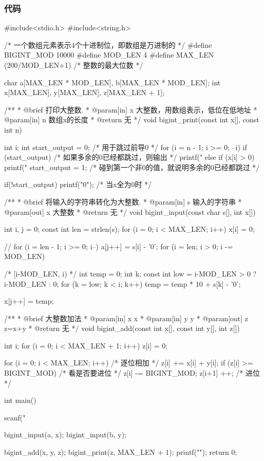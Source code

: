 \subsubsection{代码}
\begin{Codex}[label=bigint_add.c]
#include<stdio.h>
#include<string.h>

/* 一个数组元素表示4个十进制位，即数组是万进制的 */
#define BIGINT_MOD 10000
#define MOD_LEN 4
#define MAX_LEN (200/MOD_LEN+1)  /* 整数的最大位数 */

char    a[MAX_LEN * MOD_LEN], b[MAX_LEN * MOD_LEN];
int     x[MAX_LEN], y[MAX_LEN], z[MAX_LEN + 1];

/**
 * @brief 打印大整数.
 * @param[in] x 大整数，用数组表示，低位在低地址
 * @param[in] n 数组x的长度
 * @return 无
 */
void bigint_print(const int x[], const int n) {
    int i;
    int start_output = 0;  /* 用于跳过前导0 */
    for (i = n - 1; i >= 0; --i) {
        if (start_output) {  /* 如果多余的0已经都跳过，则输出 */
            printf("%
        } else if (x[i] > 0) {
            printf("%
            start_output = 1; /* 碰到第一个非0的值，就说明多余的0已经都跳过 */
        }
    }

    if(!start_output) printf("0");  /* 当x全为0时 */
}

/**
 * @brief 将输入的字符串转化为大整数.
 * @param[in] s 输入的字符串
 * @param[out] x 大整数
 * @return 无
 */
void bigint_input(const char s[], int x[]) {
    int i, j = 0;
    const int len = strlen(s);
    for (i = 0; i < MAX_LEN; i++) x[i] = 0;

    // for (i = len - 1; i >= 0; i--) a[j++] = s[i] - '0';
    for (i = len; i > 0; i -= MOD_LEN) {  /* [i-MOD_LEN, i) */
        int temp = 0;
        int k;
        const int low = i-MOD_LEN > 0 ? i-MOD_LEN : 0;
        for (k = low; k < i; k++) {
            temp = temp * 10 + s[k] - '0';
        }

        x[j++] = temp;
    }
}

/**
 * @brief 大整数加法
 * @param[in] x x
 * @param[in] y y
 * @param[out] z z=x+y
 * @return 无
 */
void bigint_add(const int x[], const int y[], int z[]) {
    int i;
    for (i = 0; i < MAX_LEN + 1; i++) z[i] = 0;

    for (i = 0; i < MAX_LEN; i++) {  /* 逐位相加 */
        z[i] += x[i] + y[i];
        if (z[i] >= BIGINT_MOD) {  /* 看是否要进位 */
            z[i] -= BIGINT_MOD;
            z[i+1] ++;  /* 进位 */
        }
    }
}


int main() {
    scanf("%

    bigint_input(a, x);
    bigint_input(b, y);

    bigint_add(x, y, z);
    bigint_print(z, MAX_LEN + 1);
    printf("\n"); 
    return 0;
}
\end{Codex}

